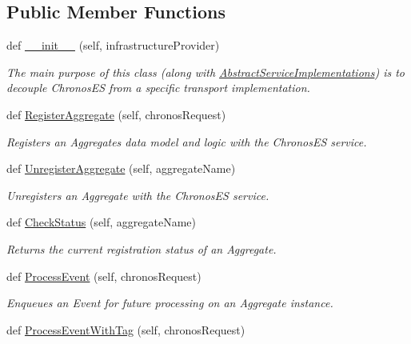 \subsection*{Public Member Functions}
\begin{DoxyCompactItemize}
\item 
def \hyperlink{group__Chronos_ga6a38ae27f3142c98e72c1835ddd3a17c}{\+\_\+\+\_\+init\+\_\+\+\_\+} (self, infrastructure\+Provider)
\begin{DoxyCompactList}\small\item\em The main purpose of this class (along with \hyperlink{classChronos_1_1Infrastructure_1_1AbstractServiceImplementations}{Abstract\+Service\+Implementations}) is to decouple Chronos\+ES from a specific transport implementation. \end{DoxyCompactList}\item 
def \hyperlink{group__Chronos_ga9db2d08d508fec263a1ac0ab32f35270}{Register\+Aggregate} (self, chronos\+Request)
\begin{DoxyCompactList}\small\item\em Registers an Aggregate\textquotesingle{}s data model and logic with the Chronos\+ES service. \end{DoxyCompactList}\item 
def \hyperlink{group__Chronos_ga14714722b17498ad6577150842e8913a}{Unregister\+Aggregate} (self, aggregate\+Name)
\begin{DoxyCompactList}\small\item\em Unregisters an Aggregate with the Chronos\+ES service. \end{DoxyCompactList}\item 
def \hyperlink{group__Chronos_ga8637a20ab0e90916d8d59b43900a5c30}{Check\+Status} (self, aggregate\+Name)
\begin{DoxyCompactList}\small\item\em Returns the current registration status of an Aggregate. \end{DoxyCompactList}\item 
def \hyperlink{group__Chronos_gacc2169d49a6cf3a6947b6362adce3669}{Process\+Event} (self, chronos\+Request)
\begin{DoxyCompactList}\small\item\em Enqueues an Event for future processing on an Aggregate instance. \end{DoxyCompactList}\item 
def \hyperlink{group__Chronos_ga5111d259b3175c8ce60ebb40ce99cdb6}{Process\+Event\+With\+Tag} (self, chronos\+Request)

\end{DoxyCompactItemize}
